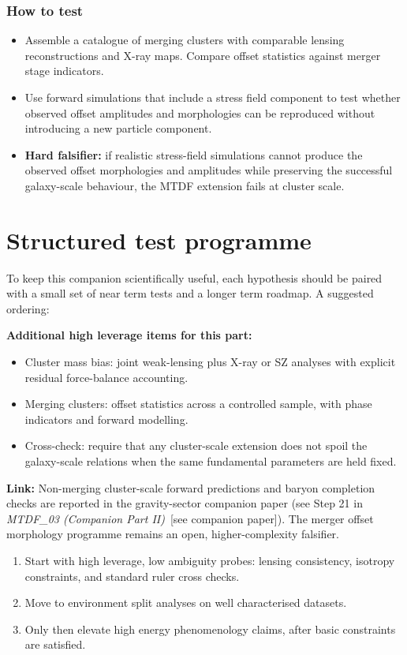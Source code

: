\documentclass[11pt,a4paper]{article}
\begin{document}
\subsubsection{How to test}
\begin{itemize}
  \item Assemble a catalogue of merging clusters with comparable lensing reconstructions and X-ray maps. Compare offset statistics against merger stage indicators.
  \item Use forward simulations that include a stress field component to test whether observed offset amplitudes and morphologies can be reproduced without introducing a new particle component.
  \item \textbf{Hard falsifier:} if realistic stress-field simulations cannot produce the observed offset morphologies and amplitudes while preserving the successful galaxy-scale behaviour, the MTDF extension fails at cluster scale.
\end{itemize}

\section{Structured test programme}
\label{sec:tests}
To keep this companion scientifically useful, each hypothesis should be paired with a small set of near term tests and a longer term roadmap. A suggested ordering:

\textbf{Additional high leverage items for this part:}

\begin{itemize}
  \item Cluster mass bias: joint weak-lensing plus X-ray or SZ analyses with explicit residual force-balance accounting.
  \item Merging clusters: offset statistics across a controlled sample, with phase indicators and forward modelling.
  \item Cross-check: require that any cluster-scale extension does not spoil the galaxy-scale relations when the same fundamental parameters are held fixed.
\end{itemize}

\textbf{Link:} Non-merging cluster-scale forward predictions and baryon completion checks are reported in the gravity-sector companion paper (see Step 21 in \textit{MTDF\_\allowbreak{}03 (Companion Part II)}~[see companion paper]). The merger offset morphology programme remains an open, higher-complexity falsifier.

\begin{enumerate}
  \item Start with high leverage, low ambiguity probes: lensing consistency, isotropy constraints, and standard ruler cross checks.
  \item Move to environment split analyses on well characterised datasets.
  \item Only then elevate high energy phenomenology claims, after basic constraints are satisfied.
\end{enumerate}
\end{document}
